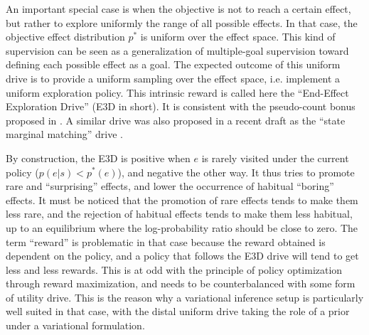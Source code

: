 \documentclass[runningheads]{llncs}
\begin{document}
An important special case is when the objective is not to reach a certain effect, but rather to explore uniformly the range of all possible effects. In that case, the objective effect distribution $p^*$ is uniform over the effect space. This kind of supervision can be seen as a generalization of multiple-goal supervision \cite{haarnoja2017reinforcement} toward defining each possible effect as a goal.  The expected outcome of this uniform drive is to provide a uniform sampling over the effect space, i.e. implement a uniform exploration policy. This intrinsic reward is called here the ``End-Effect Exploration Drive'' (E3D in short). It is consistent with the pseudo-count bonus proposed in \cite{bellemare2016unifying}. A similar drive was also proposed in a recent draft as the ``state marginal matching'' drive \cite{lee2019efficient}.


By construction, the E3D is positive when $e$ is rarely visited under the current policy ($p(e|s) < p^*(e)$), and negative the other way. It thus tries to promote rare and ``surprising'' effects, and lower the occurrence of habitual ``boring'' effects. It must be noticed that the promotion of rare effects tends to make them less rare, and the rejection of habitual effects tends to make them less habitual, up to an equilibrium where the log-probability ratio should be close to zero. The term ``reward'' is problematic in that case because the reward obtained is dependent on the policy, and a policy that follows the E3D drive will tend to get less and less rewards. This is at odd with the principle of policy optimization through reward maximization, and needs to be counterbalanced with some form of utility drive. This is the reason why a variational inference setup is particularly well suited in that case, with the distal uniform drive taking the role of a prior under a variational formulation. 



\end{document}

